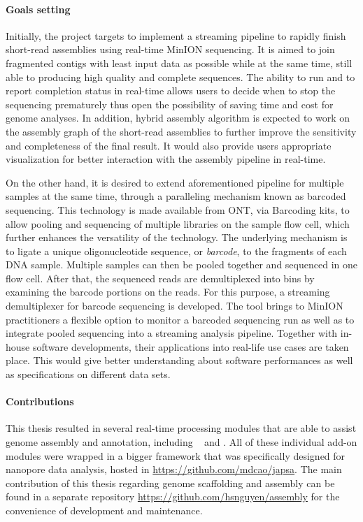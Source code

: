 \paragraph{Goals setting} Initially, the project targets to implement a streaming pipeline to rapidly finish short-read assemblies using real-time MinION sequencing. 
It is aimed to join fragmented contigs with least input data as possible while at the same time, still able to producing high quality and complete sequences. 
The ability to run and to report completion status in real-time allows users to decide when to stop the sequencing prematurely thus open the possibility of saving time and cost for genome analyses.
In addition, hybrid assembly algorithm is expected to work on the assembly graph of the short-read assemblies to further improve the sensitivity and completeness of the final result. It would also provide users appropriate visualization for better interaction with the assembly pipeline in real-time.

On the other hand, it is desired to extend aforementioned pipeline for multiple samples at the same time, through a paralleling mechanism known as barcoded sequencing.
This technology is made available from ONT, via Barcoding kits, to allow pooling and sequencing of multiple libraries on the sample flow cell, which further enhances the versatility of the technology. The underlying mechanism is to ligate a unique oligonucleotide sequence, or \emph{barcode}, to the fragments of each DNA sample. Multiple samples can then be pooled together and sequenced in one flow cell. After that, the sequenced reads are demultiplexed into bins by examining the barcode portions on the reads. 
For this purpose, a streaming demultiplexer for barcode sequencing is developed.
The tool brings to MinION practitioners a flexible option to monitor a barcoded sequencing run as well as to integrate pooled sequencing into a streaming analysis pipeline.
Together with in-house software developments, their applications into real-life use cases are taken place. This would give better understanding about software performances as well as specifications on different data sets.

\paragraph{Contributions} 
This thesis resulted in several real-time processing modules that are able to assist genome assembly and annotation, including \npscarf{}~\cite{Cao2017scaffolding} \npbarcode{}\cite{Nguyen2017barcode} and \npgraph{}. 
All of these individual add-on modules were wrapped in a bigger framework that was specifically designed for nanopore data analysis, hosted in \url{https://github.com/mdcao/japsa}. 
The main contribution of this thesis regarding genome scaffolding and assembly can be found in a separate repository \url{https://github.com/hsnguyen/assembly} for the convenience of development and maintenance.

